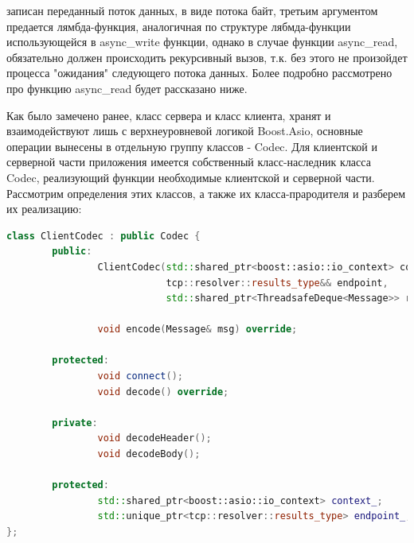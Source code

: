 \documentclass[a4paper, 14pt]{extreport}
\begin{document}
записан переданный поток данных, в виде потока байт, третьим аргументом предается лямбда-функция, аналогичная по структуре лябмда-функции
использующейся в async\_write функции, однако в случае функции async\_read, обязательно должен происходить рекурсивный вызов, т.к.
без этого не произойдет процесса "ожидания" следующего потока данных. Более подробно рассмотрено про функцию async\_read будет рассказано 
ниже.
\par Как было замечено ранее, класс сервера и класс клиента, хранят и взаимодействуют лишь с верхнеуровневой логикой Boost.Asio, основные 
операции вынесены в отдельную группу классов - Codec. Для клиентской и серверной части приложения имеется собственный класс-наследник 
класса Codec, реализующий функции необходимые клиентской и серверной части. Рассмотрим определения этих классов, а также их класса-прародителя
и разберем их реализацию:
\begin{lstlisting}[language=C++, frame=single, xleftmargin=15pt, caption={Заголовочный файл класса ClientCodec},label=DescriptiveLabel]
class ClientCodec : public Codec {
        public:
                ClientCodec(std::shared_ptr<boost::asio::io_context> context,
                            tcp::resolver::results_type&& endpoint,
                            std::shared_ptr<ThreadsafeDeque<Message>> ready_msg_storage);
        
                void encode(Message& msg) override;
        
        protected:
                void connect();
                void decode() override;
        
        private:
                void decodeHeader();
                void decodeBody();
        
        protected:
                std::shared_ptr<boost::asio::io_context> context_;
                std::unique_ptr<tcp::resolver::results_type> endpoint_;
};
\end{lstlisting}
\end{document}
